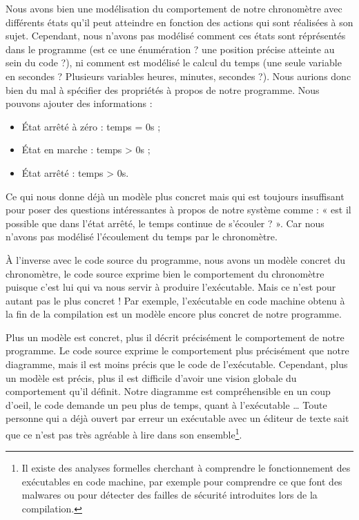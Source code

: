 \documentclass[12pt,francais,]{scrbook}
\providecommand{\tightlist}{%
  \setlength{\itemsep}{0pt}\setlength{\parskip}{0pt}}
\begin{document}
Nous avons bien une modélisation du comportement de notre chronomètre
avec différents états qu'il peut atteindre en fonction des actions qui
sont réalisées à son sujet. Cependant, nous n'avons pas modélisé comment
ces états sont réprésentés dans le programme (est ce une énumération ?
une position précise atteinte au sein du code ?), ni comment est
modélisé le calcul du temps (une seule variable en secondes ? Plusieurs
variables heures, minutes, secondes ?). Nous aurions donc bien du mal à
spécifier des propriétés à propos de notre programme. Nous pouvons
ajouter des informations :

\begin{itemize}
\tightlist
\item
  État arrêté à zéro : temps = 0s ;
\item
  État en marche : temps \textgreater{} 0s ;
\item
  État arrêté : temps \textgreater{} 0s.
\end{itemize}

Ce qui nous donne déjà un modèle plus concret mais qui est toujours
insuffisant pour poser des questions intéressantes à propos de notre
système comme : « est il possible que dans l'état arrêté, le temps
continue de s'écouler ? ». Car nous n'avons pas modélisé l'écoulement du
temps par le chronomètre.

À l'inverse avec le code source du programme, nous avons un modèle
concret du chronomètre, le code source exprime bien le comportement du
chronomètre puisque c'est lui qui va nous servir à produire
l'exécutable. Mais ce n'est pour autant pas le plus concret ! Par
exemple, l'exécutable en code machine obtenu à la fin de la compilation
est un modèle encore plus concret de notre programme.

Plus un modèle est concret, plus il décrit précisément le comportement
de notre programme. Le code source exprime le comportement plus
précisément que notre diagramme, mais il est moins précis que le code de
l'exécutable. Cependant, plus un modèle est précis, plus il est
difficile d'avoir une vision globale du comportement qu'il définit.
Notre diagramme est compréhensible en un coup d'oeil, le code demande un
peu plus de temps, quant à l'exécutable \ldots{} Toute personne qui a
déjà ouvert par erreur un exécutable avec un éditeur de texte sait que
ce n'est pas très agréable à lire dans son ensemble\footnote{Il existe
  des analyses formelles cherchant à comprendre le fonctionnement des
  exécutables en code machine, par exemple pour comprendre ce que font
  des malwares ou pour détecter des failles de sécurité introduites lors
  de la compilation.}.
\end{document}
